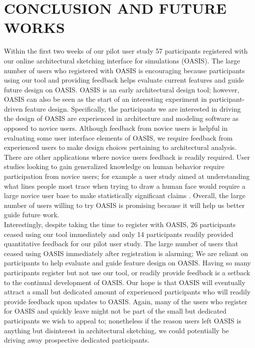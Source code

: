 \chapter{CONCLUSION AND FUTURE WORKS} \label{sec:con}

Within the first two weeks of our pilot user study  57 participants registered with our online architectural sketching interface for simulations (OASIS).  The large number of users who registered with OASIS is encouraging because participants using our tool and providing feedback helps evaluate current features and guide future design on OASIS.  OASIS is an early architectural design tool; however, OASIS can also be seen as the start of an interesting experiment in participant-driven feature design.  Specifically, the participants we are interested in driving the design of OASIS are experienced in architecture and modeling software as opposed to novice users.  Although feedback from novice users is helpful in evaluating some user interface elements of OASIS, we require feedback from experienced users to make design choices pertaining to architectural analysis.       There are other applications where novice users feedback is readily required.  User studies looking to gain generalized knowledge on human behavior require participation from novice users; for example a user study aimed at understanding what lines people most trace when trying to draw a human face would require a large novice user base to make statistically significant claims \cite{limpaecher2013real}.  Overall, the large number of users willing to try OASIS is promising because it will help us better guide future work.\\

Interestingly, despite taking the time to register with OASIS, 26 participants ceased using our tool immediately and only 14 participants readily provided quantitative feedback for our pilot user study.  The large number of users that ceased using OASIS immediately after registration is alarming; We are reliant on participants to help evaluate and guide feature design on OASIS.  Having so many participants register but not use our tool, or readily provide feedback is a setback to the continual development of OASIS.  Our hope is that OASIS will eventually attract a small but dedicated amount of experienced participants who will readily provide feedback upon updates to OASIS.  Again, many of the users who register for OASIS and quickly leave might not be part of the small but dedicated participants we wish to appeal to; nonetheless if the reason users left OASIS is anything but disinterest in architectural sketching, we could potentially be driving away prospective dedicated participants.  \\

